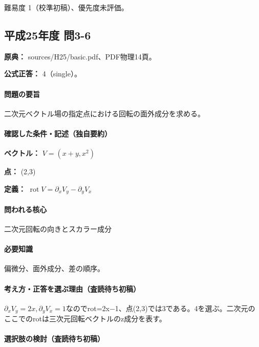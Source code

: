 \par 難易度 1（校準初稿）、優先度未評価。

\subsection{平成25年度 問3-6}
\label{q:h25-reg-basic-3-6}

\noindent\textbf{原典：} sources/H25/basic.pdf、PDF物理14頁。

\textbf{公式正答：} 4（single）。

\paragraph{問題の要旨} 二次元ベクトル場の指定点における回転の面外成分を求める。

\paragraph{確認した条件・記述（独自要約）}\mbox{}\par

\noindent\textbf{ベクトル：} \(V=(x+y,x^2)\)\par

\noindent\textbf{点：} (2,3)\par

\noindent\textbf{定義：} \(\operatorname{rot}V=\partial_xV_y-\partial_yV_x\)\par

\paragraph{問われる核心} 二次元回転の向きとスカラー成分

\paragraph{必要知識} 偏微分、面外成分、差の順序。

\paragraph{考え方・正答を選ぶ理由（査読待ち初稿）} \(\partial_xV_y=2x,\partial_yV_x=1\)なのでrot=\allowbreak{}2x−1、点(2,3)では3である。4を選ぶ。二次元のここでのrotは三次元回転ベクトルのz成分を表す。

\paragraph{選択肢の検討（査読待ち初稿）}\mbox{}\par

